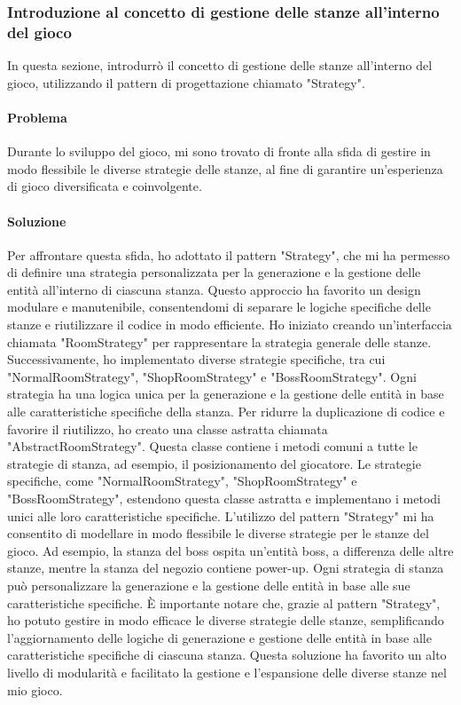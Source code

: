 \documentclass[a4paper,12pt]{report}
\begin{document}
\subsubsection{Introduzione al concetto di gestione delle stanze all'interno del gioco}
In questa sezione, introdurrò il concetto di gestione delle stanze all'interno del gioco, utilizzando il pattern di progettazione chiamato "Strategy".
\paragraph*{Problema}
Durante lo sviluppo del gioco, mi sono trovato di fronte alla sfida di gestire in modo flessibile le diverse strategie delle stanze, al fine di garantire un'esperienza di gioco diversificata e coinvolgente.
\paragraph*{Soluzione}
Per affrontare questa sfida, ho adottato il pattern "Strategy", che mi ha permesso di definire una strategia personalizzata per la generazione e la gestione delle entità all'interno di ciascuna stanza.
Questo approccio ha favorito un design modulare e manutenibile, consentendomi di separare le logiche specifiche delle stanze e riutilizzare il codice in modo efficiente.
Ho iniziato creando un'interfaccia chiamata "RoomStrategy" per rappresentare la strategia generale delle stanze. 
Successivamente, ho implementato diverse strategie specifiche, tra cui "NormalRoomStrategy", "ShopRoomStrategy" e "BossRoomStrategy".
Ogni strategia ha una logica unica per la generazione e la gestione delle entità in base alle caratteristiche specifiche della stanza.
Per ridurre la duplicazione di codice e favorire il riutilizzo, ho creato una classe astratta chiamata "AbstractRoomStrategy".
Questa classe contiene i metodi comuni a tutte le strategie di stanza, ad esempio, il posizionamento del giocatore.
Le strategie specifiche, come "NormalRoomStrategy", "ShopRoomStrategy" e "BossRoomStrategy", estendono questa classe astratta e implementano i metodi unici alle loro caratteristiche specifiche.
L'utilizzo del pattern "Strategy" mi ha consentito di modellare in modo flessibile le diverse strategie per le stanze del gioco. 
Ad esempio, la stanza del boss ospita un'entità boss, a differenza delle altre stanze, mentre la stanza del negozio contiene power-up.
Ogni strategia di stanza può personalizzare la generazione e la gestione delle entità in base alle sue caratteristiche specifiche.
È importante notare che, grazie al pattern "Strategy", ho potuto gestire in modo efficace le diverse strategie delle stanze, semplificando l'aggiornamento delle logiche di generazione e gestione delle entità in base alle caratteristiche specifiche di ciascuna stanza.
Questa soluzione ha favorito un alto livello di modularità e facilitato la gestione e l'espansione delle diverse stanze nel mio gioco.
\end{document}
